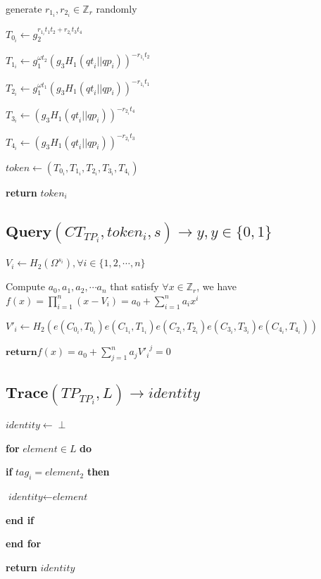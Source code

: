 \documentclass[a4paper]{article}
\begin{document}
generate $r_{1_i}, r_{2_i} \in \mathbb{Z}_r$ randomly

$T_{0_i} \gets g_2^{r_{1_i} t_1 t_2 + r_{2_i} t_3 t_4}$

$T_{1_i} \gets g_1^{\omega t_2} (g_3 H_1(\textit{qt}_i || \textit{qp}_i))^{-r_{1_i} t_2}$

$T_{2_i} \gets g_1^{\omega t_1} (g_3 H_1(\textit{qt}_i || \textit{qp}_i))^{-r_{1_i} t_1}$

$T_{3_i} \gets (g_3 H_1(\textit{qt}_i || \textit{qp}_i))^{-r_{2_i} t_4}$

$T_{4_i} \gets (g_3 H_1(\textit{qt}_i || \textit{qp}_i))^{-r_{2_i} t_3}$

$\textit{token} \gets (T_{0_i}, T_{1_i}, T_{2_i}, T_{3_i}, T_{4_i})$

\textbf{return} $\textit{token}_i$

\subsection{$\textbf{Query}(\textit{CT}_{\textit{TP}_i}, \textit{token}_i, s) \to y, y \in \{0, 1\}$}

$V_i \gets H_2(\Omega^{s_i}), \forall i \in \{1, 2, \cdots, n\}$

Compute $a_0, a_1, a_2, \cdots a_n$ that satisfy $\forall x \in \mathbb{Z}_r$, we have $f(x) = \prod\limits_{i = 1}^n (x - V_i) = a_0 + \sum\limits_{i = 1}^n a_i x^i$

$V'_i \gets H_2(e(C_{0_i}, T_{0_i}) e(C_{1_i}, T_{1_i}) e(C_{2_i}, T_{2_i}) e(C_{3_i}, T_{3_i}) e(C_{4_i}, T_{4_i}))$

$\textbf{return} f(x) = a_0 + \sum\limits_{j = 1}^n a_j {V'_i}^j = 0$

\subsection{$\textbf{Trace}(\textit{TP}_{\textit{TP}_i}, L) \to \textit{identity}$}

$\textit{identity} \gets \perp$

\textbf{for} $\textit{element} \in L$ \textbf{do}

\quad\textbf{if} $\textit{tag}_i = \textit{element}_2$ \textbf{then}

\quad\quad$\textit{identity} \gets \textit{element}$

\quad\textbf{end if}

\textbf{end for}

\textbf{return} $\textit{identity}$
\end{document}
